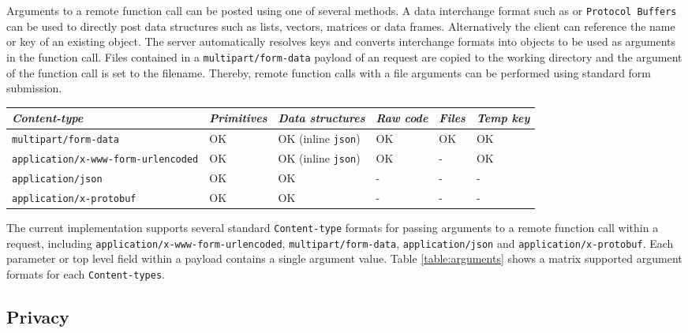 Arguments to a remote function call can be posted using one of several methods. A data interchange format such as \JSON or \texttt{Protocol Buffers} can be used to directly post data structures such as lists, vectors, matrices or data frames. Alternatively the client can reference the name or key of an existing object. The server automatically resolves keys and converts interchange formats into objects to be used as arguments in the function call. Files contained in a \texttt{multipart/form-data} payload of an \RPC request are copied to the working directory and the argument of the function call is set to the filename. Thereby, remote function calls with a file arguments can be performed using standard \HTML form submission.

\begin{sidewaystable}[ht]
\mytablesize
\centering
\begin{tabular}{@{}llllll@{}}
\toprule
\emph{Content-type}                      & \emph{Primitives} & \emph{Data structures}  &  \emph{Raw code} & \emph{Files} & \emph{Temp key} \\ \midrule
\texttt{multipart/form-data}               & OK         & OK (inline \texttt{json}) & OK       & OK   & OK            \\
\texttt{application/x-www-form-urlencoded} & OK         & OK (inline \texttt{json}) & OK       & -    & OK            \\
\texttt{application/json}                  & OK         & OK               & -        & -    & -             \\
\texttt{application/x-protobuf}            & OK         & OK               & -        & -    & -             \\ \bottomrule
\end{tabular}
\caption{Accepted request \texttt{Content-types} and supported argument formats}
\label{table:arguments}
\end{sidewaystable}

The current implementation supports several standard \texttt{Content-type} formats for passing arguments to a remote function call within a \POST request, including \texttt{application/x-www-form-urlencoded}, \texttt{multipart/form-data}, \texttt{application/json} and \texttt{application/x-protobuf}. Each parameter or top level field within a \POST payload contains a single argument value. Table \ref{table:arguments} shows a matrix supported argument formats for each \texttt{Content-types}.

\subsection{Privacy}

